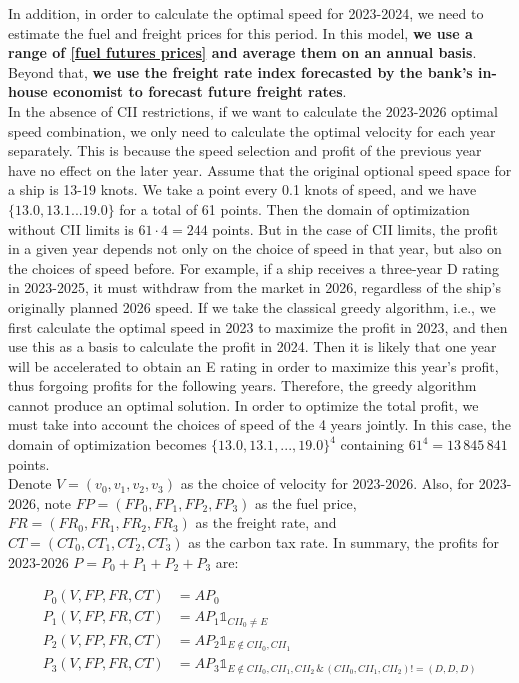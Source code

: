 \documentclass[a4paper,12pt]{article}
\begin{document}
In addition, in order to calculate the optimal speed for 2023-2024, we need to estimate the fuel and freight prices for this period.
In this model, \textbf{we use a range of \href{https://www.cmegroup.com/markets/energy/refined-products/singapore-380cst-fuel-oil-platts-swap-futures.html}{[fuel futures prices]} and average them on an annual basis}.
Beyond that, \textbf{we use the freight rate index forecasted by the bank's in-house economist to forecast future freight rates}.\\


In the absence of CII restrictions, if we want to calculate the 2023-2026 optimal speed combination, we only need to calculate the optimal velocity for each year separately.
This is because the speed selection and profit of the previous year have no effect on the later year.
Assume that the original optional speed space for a ship is 13-19 knots.
We take a point every 0.1 knots of speed, and we have $\{13.0, 13.1 ... 19.0\}$ for a total of 61 points.
Then the domain of optimization without CII limits is $61 \cdot 4 = 244$ points.
But in the case of CII limits, the profit in a given year depends not only on the choice of speed in that year, but also on the choices of speed before.
For example, if a ship receives a three-year D rating in 2023-2025, it must withdraw from the market in 2026, regardless of the ship's originally planned 2026 speed.
If we take the classical greedy algorithm, i.e., we first calculate the optimal speed in 2023 to maximize the profit in 2023, and then use this as a basis to calculate the profit in 2024.
Then it is likely that one year will be accelerated to obtain an E rating in order to maximize this year's profit, thus forgoing profits for the following years.
Therefore, the greedy algorithm cannot produce an optimal solution.
In order to optimize the total profit, we must take into account the choices of speed of the 4 years jointly.
In this case, the domain of optimization becomes $\{13.0, 13.1, ..., 19.0\}^4$ containing $61^4 = 13 \,845 \,841$ points.\\



Denote $V = (v_0, v_1, v_2, v_3)$ as the choice of velocity for 2023-2026.
Also, for 2023-2026, note $FP=(FP_0, FP_1,FP_2,FP_3)$ as the fuel price, $FR=(FR_0,FR_1,FR_2,FR_3)$ as the freight rate, and $CT=(CT_0, CT_1, CT_2, CT_3)$ as the carbon tax rate.
In summary, the profits for 2023-2026 $P=P_0+P_1+P_2+P_3$ are:

\begin{align}
	\label{eq:P}
	P_0(V, FP, FR, CT ) & = AP_0                                                                                   \\
	P_1(V, FP, FR, CT ) & = AP_1 \mathds{1} _{CII_0 \neq E}                                                        \\
	P_2(V, FP, FR, CT ) & = AP_2 \mathds{1} _{E \notin {CII_0, CII_1}}                                             \\
	P_3(V, FP, FR, CT ) & = AP_3 \mathds{1} _{E \notin {CII_0, CII_1, CII_2}\,\&\, (CII_0, CII_1, CII_2)!=(D,D,D)}
\end{align}
\end{document}
